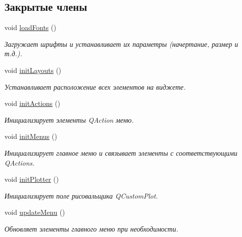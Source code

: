 \subsection*{Закрытые члены}
\begin{DoxyCompactItemize}
\item 
void \hyperlink{class_graph_window_ad4d4842869a043556a275ba06acd816b}{load\+Fonts} ()
\begin{DoxyCompactList}\small\item\em Загружает шрифты и устанавливает их параметры (начертание, размер и т.\+д.). \end{DoxyCompactList}\item 
void \hyperlink{class_graph_window_ad793717ed7de5d225e90c8ebe29474e3}{init\+Layouts} ()\hypertarget{class_graph_window_ad793717ed7de5d225e90c8ebe29474e3}{}\label{class_graph_window_ad793717ed7de5d225e90c8ebe29474e3}

\begin{DoxyCompactList}\small\item\em Устанавливает расположение всех элементов на виджете. \end{DoxyCompactList}\item 
void \hyperlink{class_graph_window_a5c8eb0b2281c1d099b5fbe0dc4d8081e}{init\+Actions} ()\hypertarget{class_graph_window_a5c8eb0b2281c1d099b5fbe0dc4d8081e}{}\label{class_graph_window_a5c8eb0b2281c1d099b5fbe0dc4d8081e}

\begin{DoxyCompactList}\small\item\em Инициализирует элементы Q\+Action меню. \end{DoxyCompactList}\item 
void \hyperlink{class_graph_window_aaac43b54c4d10097e161dea8f3280f11}{init\+Menus} ()\hypertarget{class_graph_window_aaac43b54c4d10097e161dea8f3280f11}{}\label{class_graph_window_aaac43b54c4d10097e161dea8f3280f11}

\begin{DoxyCompactList}\small\item\em Инициализирует главное меню и связывает элементы с соответствующими Q\+Actions. \end{DoxyCompactList}\item 
void \hyperlink{class_graph_window_af9dac0c26f2353aa799075ca0d710490}{init\+Plotter} ()\hypertarget{class_graph_window_af9dac0c26f2353aa799075ca0d710490}{}\label{class_graph_window_af9dac0c26f2353aa799075ca0d710490}

\begin{DoxyCompactList}\small\item\em Инициализирует поле рисовальщика Q\+Custom\+Plot. \end{DoxyCompactList}\item 
void \hyperlink{class_graph_window_a91cd37369dcf09153d6088686dc720b1}{update\+Menu} ()\hypertarget{class_graph_window_a91cd37369dcf09153d6088686dc720b1}{}\label{class_graph_window_a91cd37369dcf09153d6088686dc720b1}

\begin{DoxyCompactList}\small\item\em Обновляет элементы главного меню при необходимости. \end{DoxyCompactList}\end{DoxyCompactItemize}
